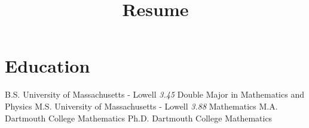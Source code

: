 \documentclass[a4paper,sans]{moderncv}
\title{Resume}
\begin{document}
    \makecvtitle
    \vspace{-8ex}
    \section{Education}
            {B.S.}
            {University of Massachusetts - Lowell}
            {}
            {\textit{3.45}}
            {Double Major in Mathematics and Physics}
            {M.S.}
            {University of Massachusetts - Lowell}
            {}
            {\textit{3.88}}
            {Mathematics}
            {M.A.}
            {Dartmouth College}
            {}
            {}
            {Mathematics}
            {Ph.D.}
            {Dartmouth College}
            {}
            {}
            {Mathematics}
\end{document}
